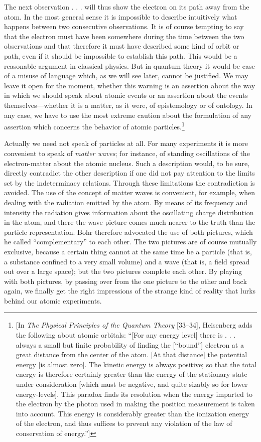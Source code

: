 The next observation . . . will thus show the electron on its path away
from the atom. In the most general sense it is impossible to describe
intuitively what happens between two consecutive observations. It is of
course tempting to say that the electron must have been somewhere during
the time between the two observations and that therefore it must have
described some kind of orbit or path, even if it should be impossible to
establish this path. This would be a reasonable argument in classical
physics. But in quantum theory it would be case of a misuse of language
which, as we will see later, cannot be justified. We may leave it open
for the moment, whether this warning is an assertion about the way in
which we should speak about atomic events or an assertion about the
events themselves---whether it is a matter, as it were, of epistemology
or of ontology. In any case, we have to use the most extreme caution
about the formulation of any assertion which concerns the behavior of
atomic particles.\footnote{{[}In \emph{The Physical Principles of the
  Quantum Theory} {[}33--34{]}, Heisenberg adds the following about
  atomic orbitals: ``{[}For any energy level{]} there is . . . always a
  small but finite probability of finding the {[}``bound''{]} electron
  at a great distance from the center of the atom. {[}At that
  distance{]} the potential energy {[}is almost zero{]}. The kinetic
  energy is always positive; so that the total energy is therefore
  certainly greater than the energy of the stationary state under
  consideration {[}which must be negative, and quite sizably so for
  lower energy-levels{]}. This paradox finds its resolution when the
  energy imparted to the electron by the photon used in making the
  position measurement is taken into account. This energy is
  considerably greater than the ionization energy of the electron, and
  thus suffices to prevent any violation of the law of conservation of
  energy.''{]}}

Actually we need not speak of particles at all. For many experiments it
is more convenient to speak of \emph{matter waves}; for instance, of
standing oscillations of the electron-matter about the atomic nucleus.
Such a description would, to be sure, directly contradict the other
description if one did not pay attention to the limits set by the
indeterminacy relations. Through these limitations the contradiction is
avoided. The use of the concept of matter waves is convenient, for
example, when dealing with the radiation emitted by the atom. By means
of its frequency and intensity the radiation gives information about the
oscillating charge distribution in the atom, and there the wave picture
comes much nearer to the truth than the particle representation. Bohr
therefore advocated the use of both pictures, which he called
``complementary'' to each other. The two pictures are of course mutually
exclusive, because a certain thing cannot at the same time be a particle
(that is, a substance confined to a very small volume) and a wave (that
is, a field spread out over a large space); but the two pictures
complete each other. By playing with both pictures, by passing over from
the one picture to the other and back again, we finally get the right
impressions of the strange kind of reality that lurks behind our atomic
experiments.

